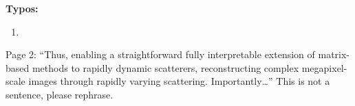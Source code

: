 \documentclass[12pt]{article}
\newenvironment{solved_reviewercomment}
    {\begin{tcolorbox}[width=\linewidth,colback=gray!5,colframe=solved_commentcolor!50,title=Reviewer Comment,left=5pt,right=5pt]}
    {\end{tcolorbox}}
\newenvironment{ourresponse}
    {\begin{tcolorbox}[width=\linewidth,breakable,enhanced,colback=gray!5,colframe=responsecolor!50,title=Response,left=5pt,right=5pt]}
    {\end{tcolorbox}}
\begin{document}
\begin{ourresponse}

\end{ourresponse}



\textbf{Typos:}

\begin{enumerate}[label=\arabic*., resume]
\item \leavevmode
\end{enumerate}
\vspace{-1em}
\begin{solved_reviewercomment}
    Page 2: “Thus, enabling a straightforward fully interpretable extension of matrix-based methods to rapidly dynamic scatterers, reconstructing complex megapixel-scale images through rapidly varying scattering. Importantly…” This is not a sentence, please rephrase.
\end{solved_reviewercomment}
\end{document}
